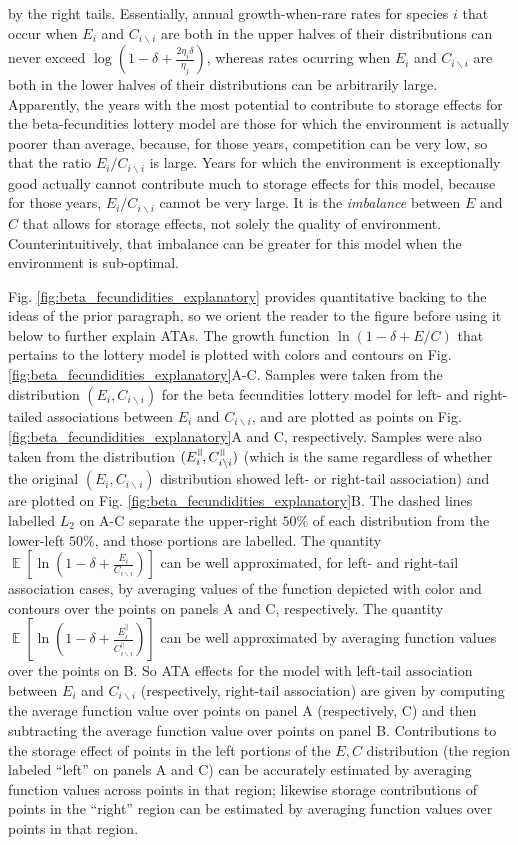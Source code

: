 \documentclass[letterpaper,11pt]{article}
\DeclareMathOperator{\E}{\mathbb{E}}%
\newcommand{\nat}{%
\text{\hspace{-1.5pt}
\begin{tikzpicture}[scale=1.8]%
\draw (.333ex,0) -- (.333ex,1ex);%
\draw (.666ex,0) -- (.666ex,1ex);
\end{tikzpicture}%
}}
\newcommand{\bs}{\backslash}
\begin{document}
by the right tails. Essentially, annual growth-when-rare rates for species $i$
that occur when $E_i$ and $C_{i \bs i}$ are both in the upper halves of their
distributions can never exceed $\log(1-\delta+\frac{2\eta_i \delta}{\eta_j})$,
whereas rates ocurring when $E_i$ and $C_{i \bs i}$ are both in the lower
halves of their distributions can be arbitrarily large. 
Apparently, the years with the most potential to 
contribute to storage
effects for the beta-fecundities lottery model are those for which the environment
is actually poorer than average, because, for those years, competition can be very low,
so that the ratio $E_i/C_{i \bs i}$ is large. Years for which the
environment is exceptionally good actually cannot contribute much to storage effects for 
this model, because for those years, $E_i/C_{i \bs i}$ cannot be very large.
It is the \emph{imbalance} between $E$ and $C$ that allows for storage effects,
not solely the quality of environment. 
Counterintuitively, that imbalance can be greater for this model when the environment is 
sub-optimal. 

Fig. \ref{fig:beta_fecundidities_explanatory} provides quantitative backing to
the ideas of the prior paragraph, so we orient the reader 
to the figure before using it below to further explain
ATAs. The growth function $\ln(1-\delta+E/C)$ that pertains to the lottery model
is plotted with colors and contours on Fig. \ref{fig:beta_fecundidities_explanatory}A-C.
Samples were taken from the distribution $(E_i,C_{i \bs i})$ for the beta 
fecundities lottery model for left- and right-tailed 
associations between $E_i$ and $C_{i \bs i}$, and are plotted as
points on Fig. \ref{fig:beta_fecundidities_explanatory}A and C, respectively. 
Samples were also taken from the distribution $(E_i^\nat,C_{i \bs i}^\nat)$
(which is the same regardless of whether the original $(E_i,C_{i \bs i})$
distribution showed left- or right-tail association) and are plotted on 
Fig. \ref{fig:beta_fecundidities_explanatory}B. 
The dashed lines labelled $L_2$ on A-C separate the upper-right $50\%$
of each distribution from the lower-left $50\%$, and those portions are labelled. 
The quantity $\E \left[ \ln \left( 1-\delta+\frac{E_i}{C_{i \bs i}} \right) \right]$ can be
well approximated, for left- and right-tail association cases, by averaging values of the
function depicted with color and contours over the points on panels A and C, 
respectively. The quantity
$\E \left[ \ln \left( 1-\delta+\frac{E_i^{||}}{C_{i \bs i}^{||}} \right) \right]$
can be well approximated by averaging function 
values over the points on B. So ATA effects for the model with left-tail association
between $E_i$ and $C_{i \bs i}$ (respectively, right-tail association) are given by 
computing the average function value over points on panel A (respectively, C)
and then subtracting the average function value over points on panel B.
Contributions to the storage effect of points in the left portions of 
the $E,C$ distribution (the region labeled ``left'' on panels A and C)
can be accurately estimated by averaging function values across
points in that region; likewise storage contributions of points in the 
``right'' region can be estimated by averaging function values over 
points in that region. 
\end{document}
